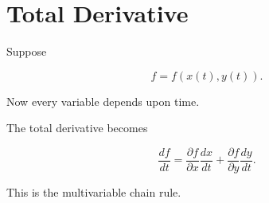 \section{Total Derivative}

Suppose

\[
f=f(x(t),y(t)).
\]

Now every variable depends upon time.

The total derivative becomes

\[
\boxed{
	\frac{df}{dt}
	=
	\frac{\partial f}{\partial x}
	\frac{dx}{dt}
	+
	\frac{\partial f}{\partial y}
	\frac{dy}{dt}.
}
\]

This is the multivariable chain rule.

